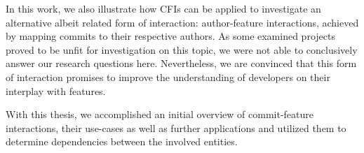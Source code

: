 In this work, we also illustrate how CFIs can be applied to investigate an alternative albeit related form of interaction: author-feature interactions, achieved by mapping commits to their respective authors.
As some examined projects proved to be unfit for investigation on this topic, we were not able to conclusively answer our research questions here.
Nevertheless, we are convinced that this form of interaction promises to improve the understanding of developers on their interplay with features.

With this thesis, we accomplished an initial overview of commit-feature interactions, their use-cases as well as further applications and utilized them to determine dependencies between the involved entities. %

\vfill

\endgroup

\vfill
